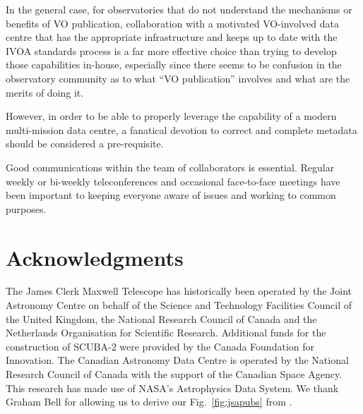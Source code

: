 \documentclass[final,authoryear,5p,times,twocolumn]{elsarticle}
\newcommand*\figref[1]{Fig.~\ref{#1}}
\begin{document}
In the general case, for observatories that do not understand the
mechanisms or benefits of VO publication, collaboration with a
motivated VO-involved data centre that has the appropriate
infrastructure and keeps up to date with the IVOA standards process is
a far more effective choice than trying to develop those capabilities
in-house, especially since there seems to be confusion in the
observatory community as to what ``VO publication'' involves and what
are the merits of doing it.

However, in order to be able to properly leverage the capability of a
modern multi-mission data centre, a fanatical devotion to correct and
complete metadata should be considered a pre-requisite.

Good communications within the team of collaborators is essential.  Regular
weekly or bi-weekly teleconferences and occasional face-to-face meetings
have been important to keeping everyone aware of issues and working to
common purposes.

\section*{Acknowledgments}

The James Clerk Maxwell Telescope has historically been operated by
the Joint Astronomy Centre on behalf of the Science and Technology
Facilities Council of the United Kingdom, the National Research
Council of Canada and the Netherlands Organisation for Scientific
Research.  Additional funds for the construction of SCUBA-2 were
provided by the Canada Foundation for Innovation.
The Canadian Astronomy Data Centre is operated by the
National Research Council of Canada with the support of the Canadian
Space Agency. This research has made use of NASA's Astrophysics
Data System. We thank Graham Bell for allowing us to derive our
\figref{fig:jsapubs} from \citet{2014SPIE9152-93}.
\end{document}
